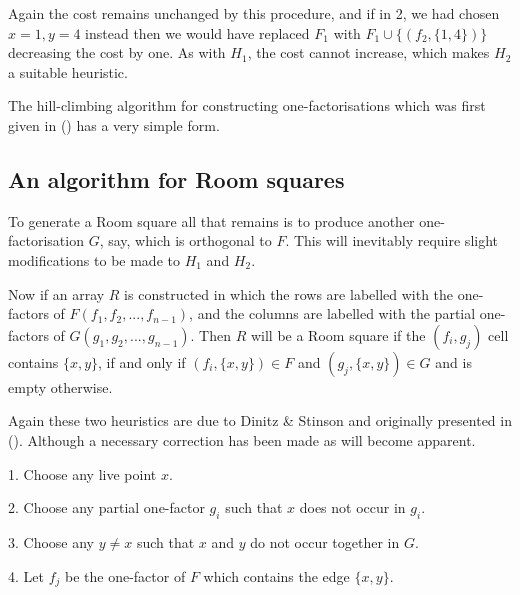 \documentclass[
  11pt,
  a4paper]{book}
\begin{document}
Again the cost remains unchanged by this procedure,
and if in 2, we had chosen \(x = 1, y = 4\) instead then
we would have replaced \(F_1\) with
\(F_1 \cup \{(f_2, \{1, 4\})\}\)
decreasing the cost by one. As with \(H_1\),
the cost cannot increase, which makes \(H_2\) a suitable
heuristic.

The hill-climbing algorithm for constructing one-factorisations
which was first given in
(\textcite{dinitz_hill-climbing_1987})
has a very simple form.

\begin{algorithm}[H]
\end{algorithm}

\hypertarget{an-algorithm-for-room-squares}{%
\subsection{An algorithm for Room squares}\label{an-algorithm-for-room-squares}}

To generate a Room square all that remains is to produce
another one-factorisation \(G\), say, which is orthogonal to
\(F\). This will inevitably require slight modifications to
be made to \(H_1\) and \(H_2\).

Now if an array \(R\) is constructed in which the rows are
labelled with the one-factors of \(F(f_1,f_2,...,f_{n-1})\),
and the columns are labelled with the partial one-factors
of \(G(g_1,g_2,...,g_{n-1})\). Then \(R\) will be a Room square
if the \((f_i,g_j)\) cell contains \(\{x,y\}\), if and only if
\((f_i,\{x,y\}) \in F\) and \((g_j,\{x,y\}) \in G\) and is empty
otherwise.

Again these two heuristics are due to Dinitz \& Stinson and
originally presented in (\textcite{dinitz_hill-climbing_1987}).
Although a necessary correction has been made as will
become apparent.

\begin{algorithm}[H]
  1. Choose any live point $x$.

  2. Choose any partial one-factor $g_i$ such that $x$ does
     not occur in $g_i$.

  3. Choose any $y \neq x$ such that $x$ and $y$ do not occur
     together in $G$.

  4. Let $f_j$ be the one-factor of $F$ which contains the 
     edge $\{x, y\}$.
     
\caption{$OH_1$}
\end{algorithm}
\end{document}

